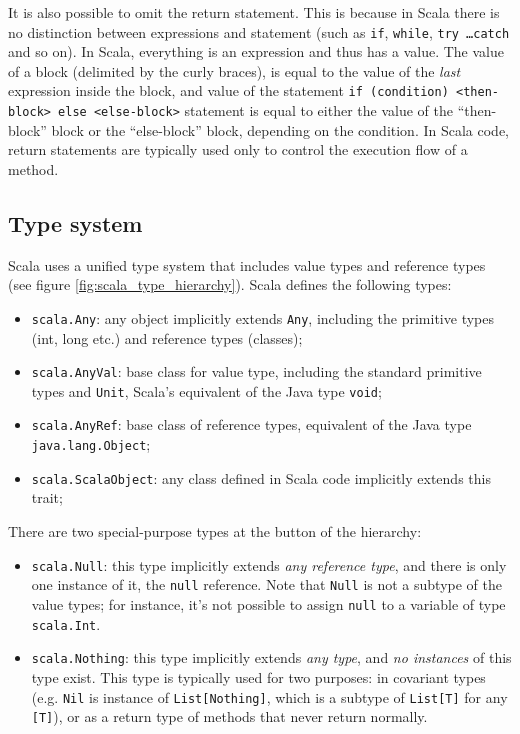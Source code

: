 It is also possible to omit the return statement. This is because in Scala there is no distinction between expressions and statement (such as \texttt{if}, \texttt{while}, \texttt{try \dots catch} and so on). In Scala, everything is an expression and thus has a value. The value of a block (delimited by the curly braces), is equal to the value of the \emph{last} expression inside the block, and value of the statement \texttt{if (condition) <then-block> else <else-block>} statement is equal to either the value of the ``then-block'' block or the ``else-block'' block, depending on the condition. In Scala code, return statements are typically used only to control the execution flow of a method.

\subsection{Type system}

Scala uses a unified type system that includes value types and reference types (see figure \ref{fig:scala_type_hierarchy}). Scala defines the following types:
\begin{itemize}
\item \texttt{scala.Any}: any object implicitly extends \texttt{Any}, including the primitive types (int, long etc.) and reference types (classes);
\item \texttt{scala.AnyVal}: base class for value type, including the standard primitive types and \texttt{Unit}, Scala's equivalent of the Java type \texttt{void};
\item \texttt{scala.AnyRef}: base class of reference types, equivalent of the Java type \texttt{java.lang.Object};
\item \texttt{scala.ScalaObject}: any class defined in Scala code implicitly extends this trait;
\end{itemize}

There are two special-purpose types at the button of the hierarchy:
\begin{itemize}
\item \texttt{scala.Null}: this type implicitly extends \emph{any reference type}, and there is only one instance of it, the \texttt{null} reference. Note that \texttt{Null} is not a subtype of the value types; for instance, it's not possible to assign \texttt{null} to a variable of type \texttt{scala.Int}.

\item \texttt{scala.Nothing}: this type implicitly extends \emph{any type}, and \emph{no instances} of this type exist. This type is typically used for two purposes: in covariant types (e.g. \texttt{Nil} is instance of \texttt{List[Nothing]}, which is a subtype of \texttt{List[T]} for any \texttt{[T]}), or as a return type of methods that never return normally.
\end{itemize}

